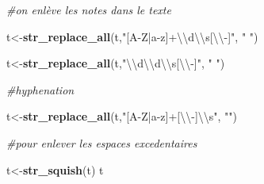 \documentclass[
]{book}
\newenvironment{Shaded}{\begin{snugshade}}{\end{snugshade}}
\newcommand{\CharTok}[1]{\textcolor[rgb]{0.31,0.60,0.02}{#1}}
\newcommand{\CommentTok}[1]{\textcolor[rgb]{0.56,0.35,0.01}{\textit{#1}}}
\newcommand{\KeywordTok}[1]{\textcolor[rgb]{0.13,0.29,0.53}{\textbf{#1}}}
\newcommand{\NormalTok}[1]{#1}
\newcommand{\StringTok}[1]{\textcolor[rgb]{0.31,0.60,0.02}{#1}}
\begin{document}
\begin{Shaded}
\begin{Highlighting}[]
\CommentTok{#on enlève les notes dans le texte}

\NormalTok{t<-}\KeywordTok{str_replace_all}\NormalTok{(t,}\StringTok{"[A-Z|a-z]+}\CharTok{\textbackslash{}\textbackslash{}}\StringTok{d}\CharTok{\textbackslash{}\textbackslash{}}\StringTok{s[}\CharTok{\textbackslash{}\textbackslash{}}\StringTok{-]"}\NormalTok{, }\StringTok{" "}\NormalTok{)}

\NormalTok{t<-}\KeywordTok{str_replace_all}\NormalTok{(t,}\StringTok{"}\CharTok{\textbackslash{}\textbackslash{}}\StringTok{d}\CharTok{\textbackslash{}\textbackslash{}}\StringTok{d}\CharTok{\textbackslash{}\textbackslash{}}\StringTok{s[}\CharTok{\textbackslash{}\textbackslash{}}\StringTok{-]"}\NormalTok{, }\StringTok{" "}\NormalTok{)}

\CommentTok{#hyphenation}

\NormalTok{t<-}\KeywordTok{str_replace_all}\NormalTok{(t,}\StringTok{"[A-Z|a-z]+[}\CharTok{\textbackslash{}\textbackslash{}}\StringTok{-]}\CharTok{\textbackslash{}\textbackslash{}}\StringTok{s"}\NormalTok{, }\StringTok{""}\NormalTok{)}

\CommentTok{#pour enlever les espaces excedentaires}

\NormalTok{t<-}\KeywordTok{str_squish}\NormalTok{(t)}
\NormalTok{t}
\end{Highlighting}
\end{Shaded}
\end{document}
